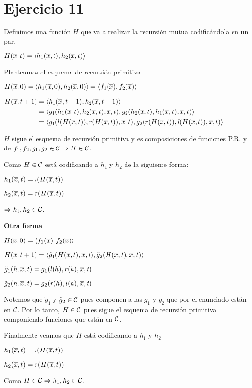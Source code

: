 \section*{Ejercicio 11}

Definimos una función $H$ que va a realizar la recursión mutua codificándola en un par.

$H(\overline{x}, t) = \langle h_1(\overline{x}, t), h_2(\overline{x}, t) \rangle$

Planteamos el esquema de recursión primitiva.

$H(\overline{x}, 0) = \langle h_1(\overline{x}, 0), h_2(\overline{x}, 0) \rangle = \langle f_1(\overline{x}), f_2(\overline{x}) \rangle$

$\begin{aligned}
H(\overline{x}, t + 1)
&= \langle h_1(\overline{x}, t + 1), h_2(\overline{x}, t + 1) \rangle \\
& = \langle g_1(h_1(\overline{x}, t), h_2(\overline{x}, t), \overline{x}, t), g_2(h_2(\overline{x}, t), h_1(\overline{x}, t), \overline{x}, t) \rangle \\
& = \langle g_1(l(H(\overline{x}, t)), r(H(\overline{x}, t)), \overline{x}, t), g_2(r(H(\overline{x}, t)), l(H(\overline{x}, t)), \overline{x}, t) \rangle
\end{aligned}$

$H$ sigue el esquema de recursión primitiva y es composiciones de funciones P.R. y de $f_1, f_2, g_1, g_2 \in \mathcal{C} \Rightarrow H \in \mathcal{C}$.

Como $H \in \mathcal{C}$ está codificando a $h_1$ y $h_2$ de la siguiente forma:

$h_1(\overline{x}, t) = l(H(\overline{x}, t))$

$h_2(\overline{x}, t) = r(H(\overline{x}, t))$

$\Rightarrow h_1, h_2 \in \mathcal{C}$.

\textbf{Otra forma}

$H(\overline{x}, 0) = \langle f_1(\overline{x}), f_2(\overline{x}) \rangle$

$H(\overline{x}, t + 1) = \langle \tilde{g}_1(H(\overline{x}, t), \overline{x}, t), \tilde{g}_2(H(\overline{x}, t), \overline{x}, t) \rangle$

$\tilde{g}_1(h, \overline{x}, t) = g_1(l(h), r(h), \overline{x}, t)$

$\tilde{g}_2(h, \overline{x}, t) = g_2(r(h), l(h), \overline{x}, t)$

Notemos que $\tilde{g}_1$ y $\tilde{g}_2 \in \mathcal{C}$ pues componen a las $g_1$ y $g_2$ que por el enunciado están en $\mathcal{C}$. Por lo tanto, $H \in \mathcal{C}$ pues sigue el esquema de recursión primitiva componiendo funciones que están en $\mathcal{C}$.

Finalmente veamos que $H$ está codificando a $h_1$ y $h_2$:

$h_1(\overline{x}, t) = l(H(\overline{x}, t))$

$h_2(\overline{x}, t) = r(H(\overline{x}, t))$

Como $H \in \mathcal{C} \Rightarrow h_1, h_2 \in \mathcal{C}$.

